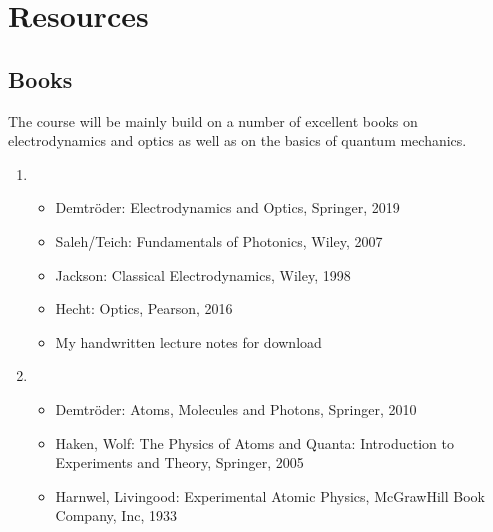 \documentclass[letterpaper,10pt,english]{sphinxmanual}
\begin{document}
\section{Resources}
\label{\detokenize{course-info/resources:resources}}\label{\detokenize{course-info/resources::doc}}

\subsection{Books}
\label{\detokenize{course-info/resources:books}}
The course will be mainly build on a number of excellent books on electrodynamics and optics as well as on the basics of quantum mechanics.
\begin{enumerate}
%
\item {} 
\begin{itemize}
\item {} 
Demtröder: Electrodynamics and Optics, Springer, 2019

\item {} 
Saleh/Teich: Fundamentals of Photonics, Wiley, 2007

\item {} 
Jackson: Classical Electrodynamics, Wiley, 1998

\item {} 
Hecht: Optics, Pearson, 2016

\item {} 
My handwritten lecture notes for download 

\end{itemize}

\item {} 
\begin{itemize}
\item {} 
Demtröder: Atoms, Molecules and Photons, Springer, 2010

\item {} 
Haken, Wolf: The Physics of Atoms and Quanta: Introduction to Experiments and Theory, Springer, 2005

\item {} 
Harnwel, Livingood: Experimental Atomic Physics, McGraw\sphinxhyphen{}Hill Book Company, Inc, 1933

\end{itemize}

\end{enumerate}
\end{document}
